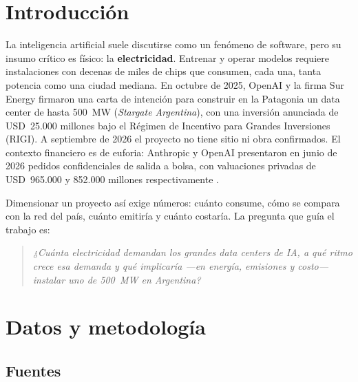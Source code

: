 \documentclass[11pt,a4paper]{article}
\begin{document}
\section{Introducción}

La inteligencia artificial suele discutirse como un fenómeno de software, pero su insumo crítico es físico: la \textbf{electricidad}. Entrenar y operar modelos requiere instalaciones con decenas de miles de chips que consumen, cada una, tanta potencia como una ciudad mediana. En octubre de 2025, OpenAI y la firma Sur Energy firmaron una carta de intención para construir en la Patagonia un data center de hasta 500~MW (\emph{Stargate Argentina}), con una inversión anunciada de USD~25.000 millones bajo el Régimen de Incentivo para Grandes Inversiones (RIGI). A septiembre de 2026 el proyecto no tiene sitio ni obra confirmados. El contexto financiero es de euforia: Anthropic y OpenAI presentaron en junio de 2026 pedidos confidenciales de salida a bolsa, con valuaciones privadas de USD~965.000 y 852.000 millones respectivamente \cite{cnbcanthropic,tcopenai}.

Dimensionar un proyecto así exige números: cuánto consume, cómo se compara con la red del país, cuánto emitiría y cuánto costaría. La pregunta que guía el trabajo es:

\begin{quote}
\itshape ¿Cuánta electricidad demandan los grandes data centers de IA, a qué ritmo crece esa demanda y qué implicaría —en energía, emisiones y costo— instalar uno de 500~MW en Argentina?
\end{quote}

\section{Datos y metodología}

\subsection{Fuentes}
\end{document}
